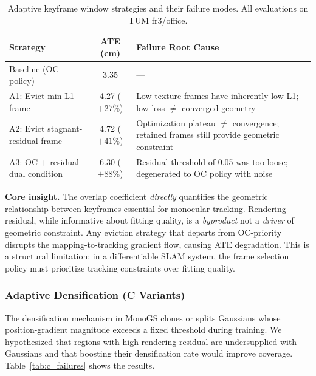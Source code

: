 \documentclass[conference]{IEEEtran}
\begin{document}
\begin{table}[htbp]
\caption{Adaptive keyframe window strategies and their failure modes. All evaluations on TUM fr3/office.}
\label{tab:a_failures}
\begin{center}
\small
\setlength{\tabcolsep}{3pt}
\begin{tabular}{|>{\centering\arraybackslash}m{90pt}|c|>{\centering\arraybackslash}m{87pt}|}
\hline
\textbf{Strategy} & \textbf{ATE (cm)} & \textbf{Failure Root Cause} \\
\hline
Baseline (OC policy) & 3.35 & --- \\
\hline
A1: Evict min-L1 frame & 4.27 ($+27\%$) & Low-texture frames have inherently low L1; low loss $\neq$ converged geometry \\
\hline
A2: Evict stagnant-residual frame & 4.72 ($+41\%$) & Optimization plateau $\neq$ convergence; retained frames still provide geometric constraint \\
\hline
A3: OC + residual dual condition & 6.30 ($+88\%$) & Residual threshold of 0.05 was too loose; degenerated to OC policy with noise \\
\hline
\end{tabular}
\end{center}
\end{table}

\textbf{Core insight.}
The overlap coefficient \textit{directly} quantifies the geometric relationship between keyframes essential for monocular tracking.
Rendering residual, while informative about fitting quality, is a \textit{byproduct} not a \textit{driver} of geometric constraint.
Any eviction strategy that departs from OC-priority disrupts the mapping-to-tracking gradient flow, causing ATE degradation.
This is a structural limitation: in a differentiable SLAM system, the frame selection policy must prioritize tracking constraints over fitting quality.

\subsubsection{Adaptive Densification (C Variants)}

The densification mechanism in MonoGS clones or splits Gaussians whose position-gradient magnitude exceeds a fixed threshold during training.
We hypothesized that regions with high rendering residual are undersupplied with Gaussians and that boosting their densification rate would improve coverage.
Table~\ref{tab:c_failures} shows the results.
\end{document}
